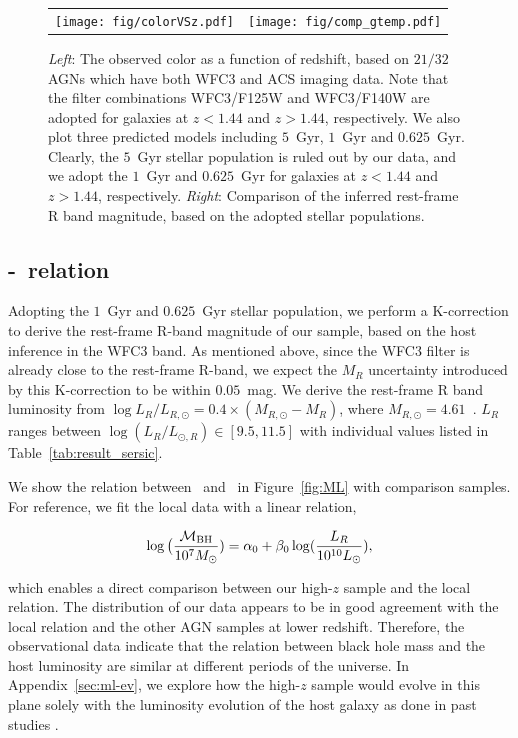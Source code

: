 \documentclass[apj]{emulateapj}
\begin{document}
\begin{figure}
\centering
\begin{tabular}{c c}
{\texttt{[image: fig/colorVSz.pdf]}}&
{\texttt{[image: fig/comp\_gtemp.pdf]}}\\
\end{tabular}
\caption{\label{fig:compare_temp} 
{\it Left}: The observed color as a function of redshift, based on $21/32$ AGNs which have both WFC3 and ACS imaging data. Note that the filter  combinations WFC3/F125W and WFC3/F140W are adopted for galaxies at $z<1.44$ and $z>1.44$, respectively. 
We also plot three predicted models including $5$~Gyr, $1$~Gyr and $0.625$~Gyr. Clearly, the $5$~Gyr stellar population is ruled out by our data, and we adopt the $1$~Gyr and $0.625$~Gyr for galaxies at $z<1.44$ and $z>1.44$, respectively.
 {\it Right}: Comparison of the inferred rest-frame R band magnitude, based on the adopted stellar populations.
}
\end{figure} 


 
\subsection{\mbh-\lhost\ relation}\label{sec:ml}

Adopting the $1$~Gyr and $0.625$~Gyr stellar population, we perform a K-correction to derive the rest-frame R-band magnitude of our sample, based on the host inference in the  WFC3 band. As mentioned above, since the WFC3 filter is already close to the rest-frame R-band, we expect the $M_R$ uncertainty introduced by this K-correction to be within $0.05$~mag. We derive the rest-frame R band luminosity from $\log L_R/L_{R, \odot} = 0.4\times(M_{R, \odot}-M_R)$, where $M_{R, \odot}=4.61$~\citep{Blanton07}. $L_R$ ranges between $\log (L_R/L_{\odot,R})  \in [9.5, 11.5]$ with individual values listed in Table~\ref{tab:result_sersic}. 

We show the relation between \mbh\ and \lhost\ in Figure~\ref{fig:ML} with comparison samples. For reference, we fit the local data with a linear relation,

\begin{eqnarray}
\label{eq:MLlocal}
\log \big( \frac{\mathcal M_{\rm BH}}{10^{7}M_{\odot}})= \alpha_0 + \beta_0 \log(\frac{L_R}{10^{10}L_{\odot}}),
\end {eqnarray}

\noindent which enables a direct comparison between our high-$z$ sample and the local relation. The distribution of our data appears to be in good agreement with the local relation and the other AGN samples at lower redshift. Therefore, the observational data indicate that the relation between black hole mass and the host luminosity are similar at different periods of the universe. In Appendix~\ref{sec:ml-ev}, we explore how the high-$z$  sample would evolve in this plane solely with the luminosity evolution of the host galaxy as done in past studies \citep[e.g., ][]{Ding2017b}. 
\end{document}

